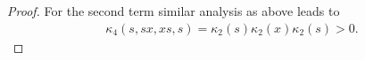 \documentclass{amsart}
\begin{document}
\begin{proof}
For the second term similar analysis as above leads to
\begin{align*}
	\kappa_4(s,sx,xs,s)=\kappa_2(s)\kappa_2(x)\kappa_2(s)>0.
\end{align*} 
%
%

\end{proof}
\end{document}
